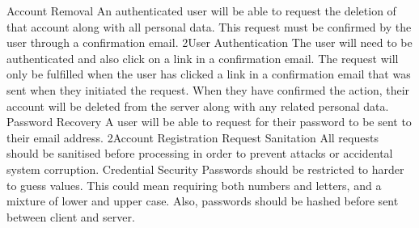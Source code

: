 		\funcreq
			{Account Removal}
			{An authenticated user will be able to request the deletion of that account along with all personal data. This request must be confirmed by the user through a confirmation email.}
			{2}{User Authentication}
			{The user will need to be authenticated and also click on a link in a confirmation email.}
			{The request will only be fulfilled when the user has clicked a link in a confirmation email that was sent when they initiated the request.}
			{When they have confirmed the action, their account will be deleted from the server along with any related personal data.}
		\funcreq
			{Password Recovery}
			{A user will be able to request for their password to be sent to their email address.}
			{2}{Account Registration}
			{} {} {}
		\nonfuncreq
			{Request Sanitation}
			{All requests should be sanitised before processing in order to prevent attacks or accidental system corruption.}
		\nonfuncreq
			{Credential Security}
			{Passwords should be restricted to harder to guess values. This could mean requiring both numbers and letters, and a mixture of lower and upper case. Also, passwords should be hashed before sent between client and server.}
